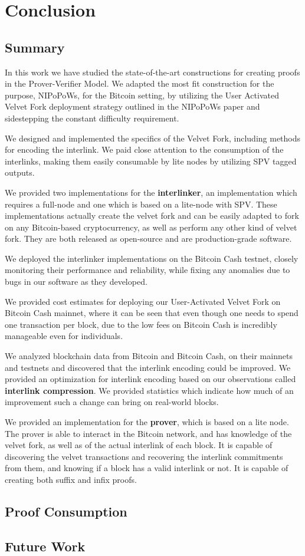 \chapter{Conclusion}

\section{Summary}
In this work we have studied the state-of-the-art constructions for creating proofs in the Prover-Verifier Model. We adapted the most fit construction for the purpose, NIPoPoWs, for the Bitcoin setting, by utilizing the User Activated Velvet Fork deployment strategy outlined in the NIPoPoWs paper and sidestepping the constant difficulty requirement.


We designed and implemented the specifics of the Velvet Fork, including methods for encoding the interlink. We paid close attention to the consumption of the interlinks, making them easily consumable by lite nodes by utilizing SPV tagged outputs.

We provided two implementations for the \textbf{interlinker}, an implementation which requires a full-node and one which is based on a lite-node with SPV. These implementations actually create the velvet fork and can be easily adapted to fork on any Bitcoin-based cryptocurrency, as well as perform any other kind of velvet fork. They are both released as open-source and are production-grade software.

We deployed the interlinker implementations on the Bitcoin Cash testnet, closely monitoring their performance and reliability, while fixing any anomalies due to bugs in our software as they developed. 

We provided cost estimates for deploying our User-Activated Velvet Fork on Bitcoin Cash mainnet, where it can be seen that even though one needs to spend one transaction per block, due to the low fees on Bitcoin Cash is incredibly manageable even for individuals.

We analyzed blockchain data from Bitcoin and Bitcoin Cash, on their mainnets and testnets and discovered that the interlink encoding could be improved. We provided an optimization for interlink encoding based on our observations called \textbf{interlink compression}. We provided statistics which indicate how much of an improvement such a change can bring on real-world blocks.

We provided an implementation for the \textbf{prover}, which is based on a lite node. The prover is able to interact in the Bitcoin network, and has knowledge of the velvet fork, as well as of the actual interlink of each block. It is capable of discovering the velvet transactions and recovering the interlink commitments from them, and knowing if a block has a valid interlink or not. It is capable of creating both suffix and infix proofs.

\section{Proof Consumption}
\section{Future Work}
